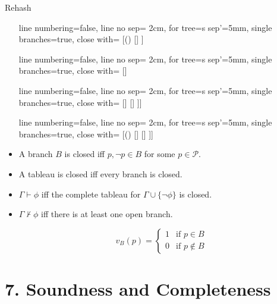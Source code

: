 \begin{frame}{Rehash}
\begin{itemize}
{\begin{center}
					\vspace{2ex}

					\begin{prooftree}
					{
					line numbering=false,
					line no sep= 2cm,
					for tree={s sep'=5mm},
					single branches=true,
					close with=\xmark
					}
					[\neg (\phi\to\psi) [\phi [\neg \psi ] ] ]
					\end{prooftree}
					\begin{prooftree}
					{
					line numbering=false,
					line no sep= 2cm,
					for tree={s sep'=5mm},
					single branches=true,
					close with=\xmark
					}
					[\phi\to\psi [\neg \phi ] [\psi ] ]
					\end{prooftree}
					\begin{prooftree}
					{
					line numbering=false,
					line no sep= 2cm,
					for tree={s sep'=5mm},
					single branches=true,
					close with=\xmark
					}
					[\phi\leftrightarrow \psi [\phi [\psi] ] [\neg \phi [\neg \psi] ] ]]
					\end{prooftree}
					\begin{prooftree}
					{
					line numbering=false,
					line no sep= 2cm,
					for tree={s sep'=5mm},
					single branches=true,
					close with=\xmark
					}
					[\neg(\phi\leftrightarrow \psi) [\phi [\neg \psi] ] [\neg \phi [ \psi] ] ]]
					\end{prooftree}

				\end{center}}
				
	\item A branch $B$ is closed iff $p,\neg p\in B$ for some $p\in\mathcal{P}$.
	
	\item A tableau is closed iff every branch is closed.
	
	\item $\Gamma\vdash \phi$ iff the complete tableau for $\Gamma\cup\{\neg\phi\}$ is closed.
	
	\item $\Gamma\nvdash\phi$  iff there is at least one open branch.
	
\[v_B(p)=\begin{cases} 1 &\text{if }p\in B\\0&\text{if }p\notin B\end{cases}\]
\end{itemize}


\end{frame}
		

\section{7. Soundness and Completeness}
